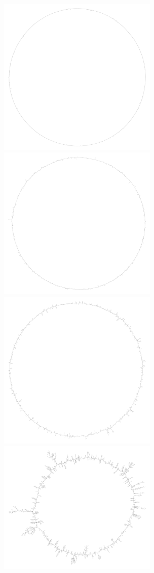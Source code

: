 \documentclass[12pt]{article} \usepackage{simplemargins}
\begin{document}

\begin{figure}
\includegraphics[width=3in]{figures/f3b001}
\includegraphics[width=3in]{figures/f3b005}\\
\includegraphics[width=3in]{figures/f3b010}
\includegraphics[width=3in]{figures/f3b015}

\end{figure}
\end{document}
